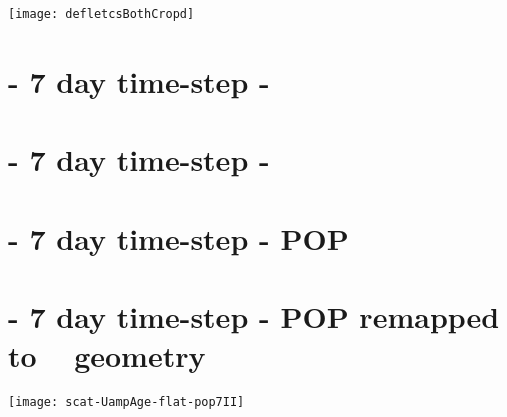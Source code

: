 \label{chap:results}

\begin{figure*}
	\texttt{[image: defletcsBothCropd]}
	\caption{Left: anticyclones. Right: cyclones. Color represents \textit{birth}-latitude. Thickness (hardly noticable) represents $\IQ$. Data is from a predecessor run to \popSevenII.}
	\label{fig:defletcsBothCropd}
\end{figure*}



\section{\MI\;- 7 day time-step - \AVI~}
\label{section:aviI}

\FloatBarrier

\section{\MII\;- 7 day time-step - \AVI~}
\label{section:aviII}

\FloatBarrier

\section{\MII\;- 7 day time-step - POP}
\label{section:pop7II}

\FloatBarrier

\section{\MII\;- 7 day time-step - POP remapped to \AVI~ geometry}
\label{section:p2aII}

\FloatBarrier

\begin{marginfigure}
		\texttt{[image: scat-UampAge-flat-pop7II]}
		\caption{\RUN Small amplitude correlates with a short life and a broad translational speed spectrum. y-axis: translational speed $[cm/s]$, x-axis: amplitude $[cm]$, color: age [months] }
		\label{fig:scat-UampAge-flat-pop7II}
\end{marginfigure}


